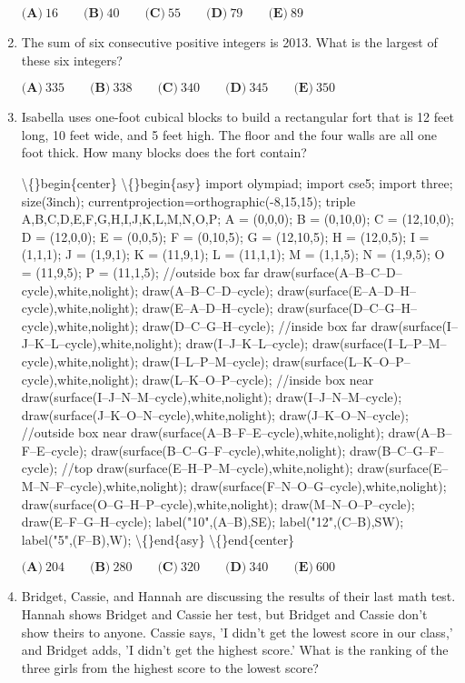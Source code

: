 \documentclass{article}
\begin{document}
\begin{enumerate}[label=\arabic*., itemsep=0.5em]
\(\textbf{(A)}\ 16 \qquad \textbf{(B)}\ 40 \qquad \textbf{(C)}\ 55 \qquad \textbf{(D)}\ 79 \qquad \textbf{(E)}\ 89\)\par \vspace{0.5em}\item The sum of six consecutive positive integers is 2013. What is the largest of these six integers?

\(\textbf{(A)}\ 335 \qquad \textbf{(B)}\ 338 \qquad \textbf{(C)}\ 340 \qquad \textbf{(D)}\ 345 \qquad \textbf{(E)}\ 350\)\par \vspace{0.5em}\item Isabella uses one-foot cubical blocks to build a rectangular fort that is 12 feet long, 10 feet wide, and 5 feet high. The floor and the four walls are all one foot thick. How many blocks does the fort contain?


\textbackslash\{\}begin\{center\}
\textbackslash\{\}begin\{asy\}
import olympiad;
import cse5;
import three;
size(3inch);
currentprojection=orthographic(-8,15,15);
triple A,B,C,D,E,F,G,H,I,J,K,L,M,N,O,P;
A = (0,0,0);
B = (0,10,0);
C = (12,10,0);
D = (12,0,0);
E = (0,0,5);
F = (0,10,5);
G = (12,10,5);
H = (12,0,5);
I = (1,1,1);
J = (1,9,1);
K = (11,9,1);
L = (11,1,1);
M = (1,1,5);
N = (1,9,5);
O = (11,9,5);
P = (11,1,5);
//outside box far
draw(surface(A--B--C--D--cycle),white,nolight);
draw(A--B--C--D--cycle);
draw(surface(E--A--D--H--cycle),white,nolight);
draw(E--A--D--H--cycle);
draw(surface(D--C--G--H--cycle),white,nolight);
draw(D--C--G--H--cycle);
//inside box far
draw(surface(I--J--K--L--cycle),white,nolight);
draw(I--J--K--L--cycle);
draw(surface(I--L--P--M--cycle),white,nolight);
draw(I--L--P--M--cycle);
draw(surface(L--K--O--P--cycle),white,nolight);
draw(L--K--O--P--cycle);
//inside box near
draw(surface(I--J--N--M--cycle),white,nolight);
draw(I--J--N--M--cycle);
draw(surface(J--K--O--N--cycle),white,nolight);
draw(J--K--O--N--cycle);
//outside box near
draw(surface(A--B--F--E--cycle),white,nolight);
draw(A--B--F--E--cycle);
draw(surface(B--C--G--F--cycle),white,nolight);
draw(B--C--G--F--cycle);
//top
draw(surface(E--H--P--M--cycle),white,nolight);
draw(surface(E--M--N--F--cycle),white,nolight);
draw(surface(F--N--O--G--cycle),white,nolight);
draw(surface(O--G--H--P--cycle),white,nolight);
draw(M--N--O--P--cycle);
draw(E--F--G--H--cycle);
label("10",(A--B),SE);
label("12",(C--B),SW);
label("5",(F--B),W);
\textbackslash\{\}end\{asy\}
\textbackslash\{\}end\{center\}


\(\textbf{(A)}\ 204 \qquad \textbf{(B)}\ 280 \qquad \textbf{(C)}\ 320 \qquad \textbf{(D)}\ 340 \qquad \textbf{(E)}\ 600\)\par \vspace{0.5em}\item Bridget, Cassie, and Hannah are discussing the results of their last math test. Hannah shows Bridget and Cassie her test, but Bridget and Cassie don't show theirs to anyone. Cassie says, 'I didn't get the lowest score in our class,' and Bridget adds, 'I didn't get the highest score.' What is the ranking of the three girls from the highest score to the lowest score?


\end{enumerate}
\end{document}
